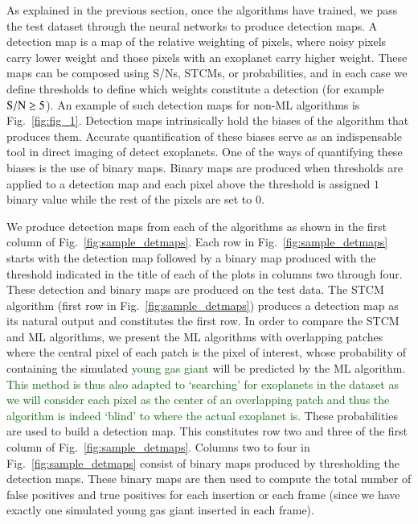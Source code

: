 \documentclass{aa}
\newcommand{\newchange}[1]{\textcolor{darkgreen}{#1}}
\begin{document}
As explained in the previous section, once the algorithms have trained, we pass the test dataset through the neural networks to produce detection maps.
A detection map is a map of the relative weighting of pixels, where noisy pixels carry lower weight and those pixels with an exoplanet carry higher weight.
These maps can be composed using S/Ns, STCMs, or probabilities, and in each case we define thresholds to define which weights constitute a detection (for example $\rm{S/N}\ge 5$).
An example of such detection maps for non-ML algorithms is Fig.~\ref{fig:fig_1}.
Detection maps intrinsically hold the biases of the algorithm that produces them. Accurate quantification of these biases serve as an indispensable tool in direct imaging of detect exoplanets.
One of the ways of quantifying these biases is the use of  binary maps.
Binary maps are produced when thresholds are applied to a detection map and each pixel above the threshold is assigned $1$ binary value while the rest of the pixels are set to $0$.

We produce detection maps from each of the algorithms as shown in the first column of Fig.~\ref{fig:sample_detmaps}.
Each row in Fig.~\ref{fig:sample_detmaps} starts with the detection map followed by a binary map produced with the threshold indicated in the title of each of the plots in columns two through four.
These detection and binary maps are produced on the test data.
The STCM algorithm (first row in Fig.~\ref{fig:sample_detmaps}) produces a detection map as its natural output and constitutes the first row.
In order to compare the STCM and ML algorithms, we present the ML algorithms with overlapping patches where the central pixel of each patch is the pixel of interest, whose probability of containing the simulated \newchange{young gas giant} will be predicted by the ML algorithm.
\newchange{This method is thus also adapted to `searching' for exoplanets in the dataset as we will consider each pixel as the center of an overlapping patch and thus the algorithm is indeed `blind' to where the actual exoplanet is.}
These probabilities are used to build a detection map.
This constitutes row two and three of the first column of Fig.~\ref{fig:sample_detmaps}.
Columns two to four in Fig.~\ref{fig:sample_detmaps} consist of binary maps produced by thresholding the detection maps.
These binary maps are then used to compute the total number of false positives and true positives for each insertion or each frame (since we have exactly one simulated young gas giant inserted in each frame).
\end{document}
